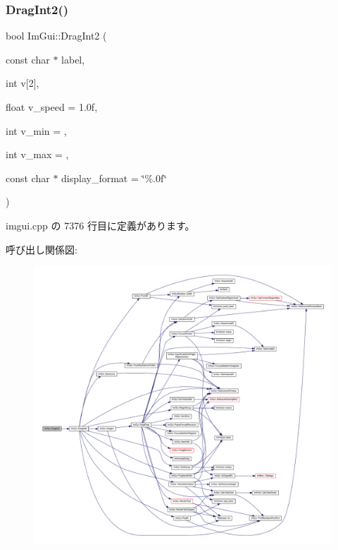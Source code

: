 \subsubsection{\texorpdfstring{Drag\+Int2()}{DragInt2()}}
{\footnotesize\ttfamily bool Im\+Gui\+::\+Drag\+Int2 (\begin{DoxyParamCaption}\item[{const char $\ast$}]{label,  }\item[{int}]{v\mbox{[}2\mbox{]},  }\item[{float}]{v\+\_\+speed = {\ttfamily 1.0f},  }\item[{int}]{v\+\_\+min = {},  }\item[{int}]{v\+\_\+max = {},  }\item[{const char $\ast$}]{display\+\_\+format = {\ttfamily \char`\"{}\%.0f\char`\"{}} }\end{DoxyParamCaption})}



 imgui.\+cpp の 7376 行目に定義があります。

呼び出し関係図\+:\nopagebreak
\begin{figure}[H]
\begin{center}
\leavevmode
\includegraphics[width=350pt]{namespace_im_gui_aa74f28deeb62f0aa96e1c34b27e7bcd9_cgraph}
\end{center}
\end{figure}
\mbox{\label{namespace_im_gui_ab0b40f3d0631113d54fa8e0c90ed4f77}} 
